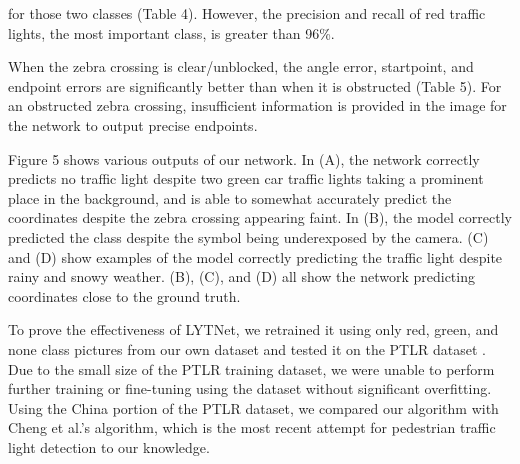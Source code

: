 \documentclass[runningheads]{llncs}
\begin{document}
for those two classes (Table 4). However, the precision and recall of red traffic lights, the most important class, is greater than 96\%.

When the zebra crossing is clear/unblocked, the angle error, startpoint, and endpoint errors are significantly better than when it is obstructed (Table 5). For an obstructed zebra crossing, insufficient information is provided in the image for the network to output precise endpoints. 

Figure 5 shows various outputs of our network. In (A), the network correctly predicts no traffic light despite two green car traffic lights taking a prominent place in the background, and is able to somewhat accurately predict the coordinates despite the zebra crossing appearing faint. In (B), the model correctly predicted the class despite the symbol being underexposed by the camera. (C) and (D) show examples of the model correctly predicting the traffic light despite rainy and snowy weather. (B), (C), and (D) all show the network predicting coordinates close to the ground truth. 

To prove the effectiveness of LYTNet, we retrained it using only red, green, and none class pictures from our own dataset and tested it on the PTLR dataset \cite{5}. Due to the small size of the PTLR training dataset, we were unable to perform further training or fine-tuning using the dataset without significant overfitting. Using the China portion of the PTLR dataset, we compared our algorithm with Cheng et al.'s algorithm, which is the most recent attempt for pedestrian traffic light detection to our knowledge. 
\end{document}

